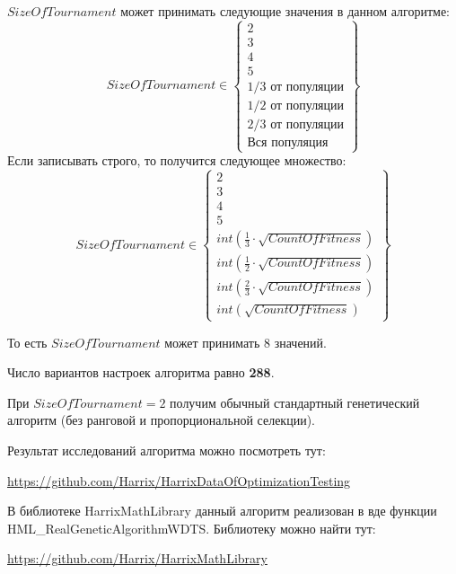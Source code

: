 $SizeOfTournament$ может принимать следующие значения в данном алгоритме:
\begin{equation}
SizeOfTournament \in \begin{Bmatrix}
2\\ 
3\\ 
4\\ 
5\\ 
1/3\text{ от популяции}\\ 
1/2\text{ от популяции}\\ 
2/3\text{ от популяции}\\ 
\text{Вся популяция} 
\end{Bmatrix}
\end{equation}
Если записывать строго, то получится следующее множество:
\begin{equation}
SizeOfTournament \in \begin{Bmatrix}
2\\ 
3\\ 
4\\ 
5\\ 
int\left( \frac{1}{3}\cdot  \sqrt{CountOfFitness}\right)  \\ 
int\left( \frac{1}{2}\cdot  \sqrt{CountOfFitness}\right)\\ 
int\left( \frac{2}{3}\cdot  \sqrt{CountOfFitness}\right)\\ 
int\left( \sqrt{CountOfFitness}\right)
\end{Bmatrix}
\end{equation}

То есть $SizeOfTournament$ может принимать $ 8 $ значений.

Число вариантов настроек алгоритма равно \textbf{288}.

При $ SizeOfTournament=2 $ получим обычный стандартный генетический алгоритм (без ранговой и пропорциональной селекции).

Результат исследований алгоритма можно посмотреть тут:

\href{https://github.com/Harrix/HarrixDataOfOptimizationTesting}{https://github.com/Harrix/HarrixDataOfOptimizationTesting}

В библиотеке HarrixMathLibrary данный алгоритм реализован в вде функции HML\_RealGeneticAlgorithmWDTS. Библиотеку можно найти тут:

\href{https://github.com/Harrix/HarrixMathLibrary}{https://github.com/Harrix/HarrixMathLibrary}